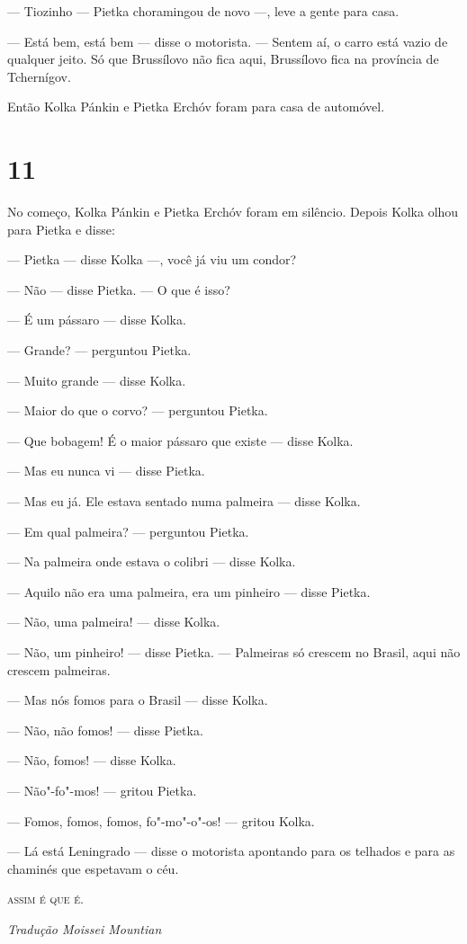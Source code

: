 --- Tiozinho --- Pietka choramingou de novo ---, leve a gente para casa.

--- Está bem, está bem --- disse o motorista. --- Sentem aí, o carro
está vazio de qualquer jeito. Só que Brussílovo não fica aqui,
Brussílovo fica na província de Tchernígov.

Então Kolka Pánkin e Pietka Erchóv foram para casa de automóvel.

\section{11}

No começo, Kolka Pánkin e Pietka Erchóv foram em silêncio. Depois Kolka
olhou para Pietka e disse:

--- Pietka --- disse Kolka ---, você já viu um condor?

--- Não --- disse Pietka. --- O que é isso?

--- É um pássaro --- disse Kolka.

--- Grande? --- perguntou Pietka.

--- Muito grande --- disse Kolka.

--- Maior do que o corvo? --- perguntou Pietka.

--- Que bobagem! É o maior pássaro que existe --- disse Kolka.

--- Mas eu nunca vi --- disse Pietka.

--- Mas eu já. Ele estava sentado numa palmeira --- disse Kolka.

--- Em qual palmeira? --- perguntou Pietka.

--- Na palmeira onde estava o colibri --- disse Kolka.

--- Aquilo não era uma palmeira, era um pinheiro --- disse Pietka.

--- Não, uma palmeira! --- disse Kolka.

--- Não, um pinheiro! --- disse Pietka. --- Palmeiras só crescem no
Brasil, aqui não crescem palmeiras.

--- Mas nós fomos para o Brasil --- disse Kolka.

--- Não, não fomos! --- disse Pietka.

--- Não, fomos! --- disse Kolka.

--- Não"-fo"-mos! --- gritou Pietka.

--- Fomos, fomos, fomos, fo"-mo"-o"-os! --- gritou Kolka.

--- Lá está Leningrado --- disse o motorista apontando para os telhados
e para as chaminés que espetavam o céu.

\bigskip

\begin{center}
\textsc{assim é que é.}
\end{center}

\medskip

{\footnotesize\hfill\emph{Tradução Moissei Mountian}}
